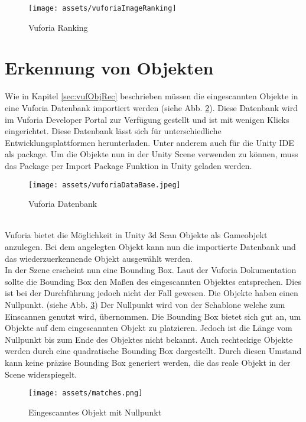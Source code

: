 \begin{figure}[h]
        \texttt{[image: assets/vuforiaImageRanking]}
        \caption{Vuforia Ranking}
        \label{fig:impl_vuforiaRanking}
\end{figure}

\section{Erkennung von Objekten}
Wie in Kapitel \ref{sec:vufObjRec} beschrieben müssen die eingescannten Objekte in eine Vuforia Datenbank importiert werden (siehe Abb. \ref{fig:vuforiaObjectDatabase}). Diese Datenbank wird im Vuforia Developer Portal zur Verfügung gestellt und ist mit wenigen Klicks eingerichtet. Diese Datenbank lässt sich für unterschiedliche Entwicklungsplattformen herunterladen. Unter anderem auch für die Unity IDE als package. Um die Objekte nun in der Unity Scene verwenden zu können, muss das Package per Import Package Funktion in Unity geladen werden.
\begin{figure}[h]
    \centering
    \texttt{[image: assets/vuforiaDataBase.jpeg]}
    \caption{Vuforia Datenbank}\label{fig:vuforiaObjectDatabase}
\end{figure}\\
Vuforia bietet die Möglichkeit in Unity 3d Scan Objekte als Gameobjekt anzulegen. Bei dem angelegten Objekt kann nun die importierte Datenbank und das wiederzuerkennende Objekt ausgewählt werden. \\
In der Szene erscheint nun eine Bounding Box. Laut der Vuforia Dokumentation\cite{VufObjRec}  sollte die Bounding Box den Maßen des eingescannten Objektes entsprechen. Dies ist bei der Durchführung jedoch nicht der Fall gewesen. Die Objekte haben einen Nullpunkt. (siehe Abb. \ref{fig:matches}) Der Nullpunkt wird von der Schablone welche zum Einscannen genutzt wird, übernommen. Die Bounding Box bietet sich gut an, um Objekte auf dem eingescannten Objekt zu platzieren. Jedoch ist die Länge vom Nullpunkt bis zum Ende des Objektes nicht bekannt. Auch rechteckige Objekte werden durch eine quadratische Bounding Box dargestellt. Durch diesen Umstand kann keine präzise Bounding Box generiert werden, die das reale Objekt in der Scene widerspiegelt.\\
\begin{figure}[h]
    \centering
    \texttt{[image: assets/matches.png]}
    \caption{Eingescanntes Objekt mit Nullpunkt}\label{fig:matches}
\end{figure}\\
